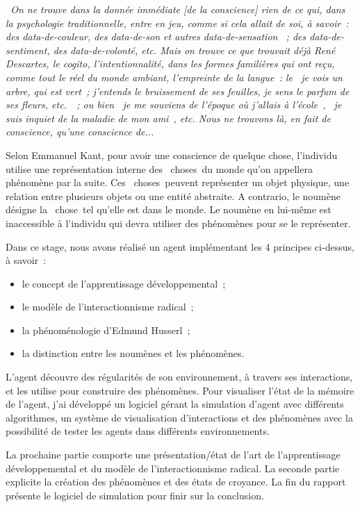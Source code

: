 \documentclass{llncs}
\begin{document}
\emph{\og~On ne trouve dans la donnée immédiate [de la conscience] rien de ce qui, dans la psychologie traditionnelle, entre en jeu, comme si cela allait de soi, à savoir~: des data-de-couleur, des data-de-son et autres data-de-sensation ~; des data-de-sentiment, des data-de-volonté, etc. Mais on trouve ce que trouvait déjà René Descartes, le cogito, l'intentionnalité, dans les formes familières qui ont reçu, comme tout le réel du monde ambiant, l'empreinte de la langue~: le \og~je vois un arbre, qui est vert~; j'entends le bruissement de ses feuilles, je sens le parfum de ses fleurs, etc.~\fg ~; ou bien \og~je me souviens de l'époque où j'allais à l'école~\fg, \og~je suis inquiet de la maladie de mon ami~\fg, etc. Nous ne trouvons là, en fait de conscience, qu'une conscience de...~\fg} \cite{phenomenologie-husserl}

Selon Emmanuel Kant, pour avoir une conscience de quelque chose, l'individu utilise une représentation interne des \og~choses~\fg du monde qu'on appellera phénomène par la suite. Ces \og~choses~\fg peuvent représenter un objet physique, une relation entre plusieurs objets ou une entité abstraite. A contrario, le noumène désigne la \og~chose~\fg tel qu'elle est dans le monde. Le noumène en lui-même est inaccessible à l'individu qui devra utiliser des phénomènes pour se le représenter. 

Dans ce stage, nous avons réalisé un agent implémentant les 4 principes ci-dessus, à savoir~: 
\begin{itemize}
	\item le concept de l'apprentissage développemental~;
	\item le modèle de l'interactionnisme radical~;
	\item la phénoménologie d'Edmund Husserl~;
	\item la distinction entre les noumènes et les phénomènes.
\end{itemize}

L'agent découvre des régularités de son environnement, à travers ses interactions, et les utilise pour construire des phénomènes. 
Pour visualiser l'état de la mémoire de l'agent, j'ai développé un logiciel gérant la simulation d'agent avec différents algorithmes, un système de visualisation d'interactions et des phénomènes avec la possibilité de tester les agents dans différents environnements. 

La prochaine partie comporte une présentation/état de l'art de l'apprentissage développemental et du modèle de l'interactionnisme radical. La seconde partie explicite la création des phénomènes et des états de croyance. La fin du rapport présente le logiciel de simulation pour finir sur la conclusion.
\end{document}

